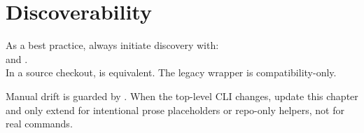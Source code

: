 \section{Discoverability}
As a best practice, always initiate discovery with:\\
 and .\\
In a source checkout,  is equivalent. The legacy  wrapper is compatibility-only.

Manual drift is guarded by .
When the top-level CLI changes, update this chapter and only extend
 for intentional prose placeholders
or repo-only helpers, not for real  commands.

